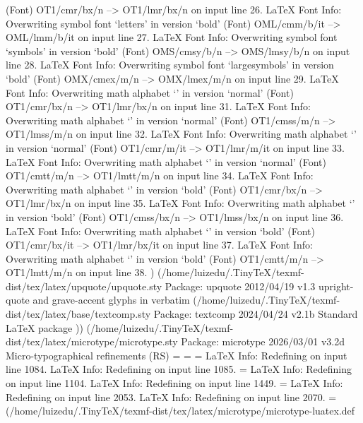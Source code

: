 (Font)                  OT1/cmr/bx/n --> OT1/lmr/bx/n on input line 26.
LaTeX Font Info:    Overwriting symbol font `letters' in version `bold'
(Font)                  OML/cmm/b/it --> OML/lmm/b/it on input line 27.
LaTeX Font Info:    Overwriting symbol font `symbols' in version `bold'
(Font)                  OMS/cmsy/b/n --> OMS/lmsy/b/n on input line 28.
LaTeX Font Info:    Overwriting symbol font `largesymbols' in version `bold'
(Font)                  OMX/cmex/m/n --> OMX/lmex/m/n on input line 29.
LaTeX Font Info:    Overwriting math alphabet `\mathbf' in version `normal'
(Font)                  OT1/cmr/bx/n --> OT1/lmr/bx/n on input line 31.
LaTeX Font Info:    Overwriting math alphabet `\mathsf' in version `normal'
(Font)                  OT1/cmss/m/n --> OT1/lmss/m/n on input line 32.
LaTeX Font Info:    Overwriting math alphabet `\mathit' in version `normal'
(Font)                  OT1/cmr/m/it --> OT1/lmr/m/it on input line 33.
LaTeX Font Info:    Overwriting math alphabet `\mathtt' in version `normal'
(Font)                  OT1/cmtt/m/n --> OT1/lmtt/m/n on input line 34.
LaTeX Font Info:    Overwriting math alphabet `\mathbf' in version `bold'
(Font)                  OT1/cmr/bx/n --> OT1/lmr/bx/n on input line 35.
LaTeX Font Info:    Overwriting math alphabet `\mathsf' in version `bold'
(Font)                  OT1/cmss/bx/n --> OT1/lmss/bx/n on input line 36.
LaTeX Font Info:    Overwriting math alphabet `\mathit' in version `bold'
(Font)                  OT1/cmr/bx/it --> OT1/lmr/bx/it on input line 37.
LaTeX Font Info:    Overwriting math alphabet `\mathtt' in version `bold'
(Font)                  OT1/cmtt/m/n --> OT1/lmtt/m/n on input line 38.
) (/home/luizedu/.TinyTeX/texmf-dist/tex/latex/upquote/upquote.sty
Package: upquote 2012/04/19 v1.3 upright-quote and grave-accent glyphs in verbatim
(/home/luizedu/.TinyTeX/texmf-dist/tex/latex/base/textcomp.sty
Package: textcomp 2024/04/24 v2.1b Standard LaTeX package
)) (/home/luizedu/.TinyTeX/texmf-dist/tex/latex/microtype/microtype.sty
Package: microtype 2026/03/01 v3.2d Micro-typographical refinements (RS)
\MT@toks=
\MT@tempbox=
\MT@count=
LaTeX Info: Redefining \noprotrusionifhmode on input line 1084.
LaTeX Info: Redefining \leftprotrusion on input line 1085.
\MT@prot@toks=
LaTeX Info: Redefining \rightprotrusion on input line 1104.
LaTeX Info: Redefining \textls on input line 1449.
\MT@outer@kern=
LaTeX Info: Redefining \microtypecontext on input line 2053.
LaTeX Info: Redefining \textmicrotypecontext on input line 2070.
\MT@listname@count=
(/home/luizedu/.TinyTeX/texmf-dist/tex/latex/microtype/microtype-luatex.def
